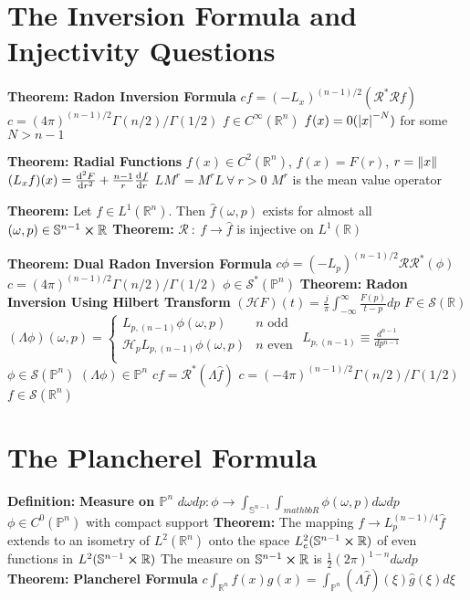 \documentclass[14pt]{extarticle}
\def\Definition{{\color{blue} \textbf{Definition:} }}
\def\Theorem{{\color{red} \textbf{Theorem:} }}
\begin{document}
\begin{outline}
	\section*{The Inversion Formula and Injectivity Questions}
		\1	\Theorem \textbf{Radon Inversion Formula}
			\2	$cf = (-L_x)^{(n-1)/2}(\mathcal{R}^*\mathcal{R}f)$
				\3	$c = (4\pi)^{(n-1)/2}\Gamma(n/2)/\Gamma(1/2)$
				\3	$f \in C^{\infty}(\mathbb{R}^n)$
				\3	$f(x) = 0(\abs{x}^{-N})$ for some $N > n-1$

		\1	\Theorem \textbf{Radial Functions}
			\2	$f(x) \in C^2(\mathbb{R}^n)$, $f(x) = F(r)$, $r = \norm{x}$
			\2	$(L_xf)(x) = \od[2]{F}{r} + \frac{n-1}{r}\od{f}{r}$
			\2	$LM^r = M^rL~\forall~r > 0$
				\3	$M^r$ is the mean value operator

		\1	\Theorem Let $f \in L^1(\mathbb{R}^n)$.  Then $\hat{f}(\omega,p)$ exists
				for almost all $(\omega,p) \in \mathbb{S}^{n-1} \cross \mathbb{R}$
		\1	\Theorem $\mathcal{R}~:~f \rightarrow \hat{f}$ is injective on $L^1(\mathbb{R})$

		\1	\Theorem \textbf{Dual Radon Inversion Formula}
			\2	$c\phi = (-L_p)^{(n-1)/2}\mathcal{R}\mathcal{R}^*(\phi)$
				\3	$c = (4\pi)^{(n-1)/2}\Gamma(n/2)/\Gamma(1/2)$
				\3	$\phi \in \mathcal{S}^*(\mathbb{P}^n)$
		\1	\Theorem \textbf{Radon Inversion Using Hilbert Transform}
			\2	$(\mathcal{H}F)(t) = \frac{j}{\pi}\int_{-\infty}^{\infty}\frac{F(p)}{t - p}dp$
				\3	$F \in \mathcal{S}(\mathbb{R})$
			\2	$(\Lambda \phi)(\omega,p) = \begin{cases}
																				L_{p,(n-1)} \phi(\omega,p) & n \text{ odd } \\
																				\mathcal{H}_p L_{p,(n-1)}\phi(\omega,p) & n \text{ even} \\
																			\end{cases}$
				\3	$L_{p,(n-1)} \equiv \frac{d^{n-1}}{dp^{n-1}}$
				\3	$\phi \in \mathcal{S}(\mathbb{P}^n)$
				\3	$(\Lambda \phi) \in \mathbb{P}^n$
			\2	$cf = \mathcal{R}^*(\Lambda \hat{f})$
				\3	$c = (-4\pi)^{(n-1)/2}\Gamma(n/2)/\Gamma(1/2)$
				\3	$f \in \mathcal{S}(\mathbb{R}^n)$	
	\section*{The Plancherel Formula}
		\1	\Definition \textbf{Measure on $\mathbb{P}^n$}
			\2	$d\omega dp : \phi \rightarrow \int_{\mathbb{S}^{n-1}}\int_{mathbb{R}}\phi(\omega,p)d\omega dp$
			\2	$\phi \in C^0(\mathbb{P}^n)$ with compact support
		\1	\Theorem The mapping $f \rightarrow L_p^{(n-1)/4}\hat{f}$ extends to 
				an isometry of $L^2(\mathbb{R}^n)$ onto the space $L_e^2(\mathbb{S}^{n-1} \cross \mathbb{R})$
				of even functions in $L^2(\mathbb{S}^{n-1} \cross \mathbb{R})$
			\2	The measure on $\mathbb{S}^{n-1} \cross \mathbb{R}$ is
					$\frac{1}{2}(2 \pi)^{1-n} d\omega dp$
		\1	\Theorem \textbf{Plancherel Formula}
			\2	$c \int_{\mathbb{R}^n} f(x)g(x) = \int_{\mathbb{P}^n}(\Lambda \hat{f})(\xi)
					\hat{g}(\xi) d\xi$
	

\end{outline}
\end{document}
